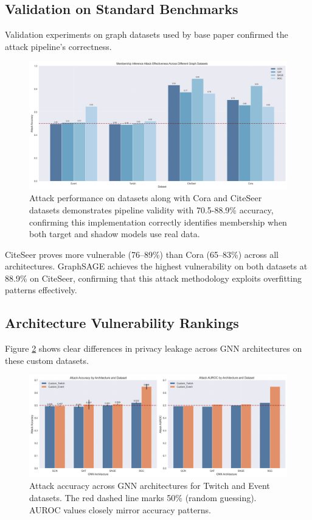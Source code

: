 \documentclass{article}
\begin{document}
\subsection{Validation on Standard Benchmarks}
Validation experiments on graph datasets used by base paper \cite{olatunji2021membershipinferenceattackgraph} confirmed the attack pipeline's correctness.

\begin{figure}[H]
\centering
\includegraphics[width=\textwidth]{../Results/visualizations/comprehensive_datasets_comparison.png}
\caption{Attack performance on datasets along with Cora and CiteSeer datasets demonstrates pipeline validity with 70.5-88.9\% accuracy, confirming this implementation correctly identifies membership when both target and shadow models use real data.}
\label{fig:baseline}
\end{figure}

CiteSeer proves more vulnerable (76--89\%) than Cora (65--83\%) across all architectures. GraphSAGE achieves the highest vulnerability on both datasets at 88.9\% on CiteSeer, confirming that this attack methodology exploits overfitting patterns effectively.

\subsection{Architecture Vulnerability Rankings}
Figure \ref{fig:attack-performance} shows clear differences in privacy leakage across GNN architectures on these custom datasets.

\begin{figure}[H]
\centering
\includegraphics[width=\textwidth]{../Results/visualizations/attack_performance_comparison.png}
\caption{Attack accuracy across GNN architectures for Twitch and Event datasets. The red dashed line marks 50\% (random guessing). AUROC values closely mirror accuracy patterns.}
\label{fig:attack-performance}
\end{figure}
\end{document}
